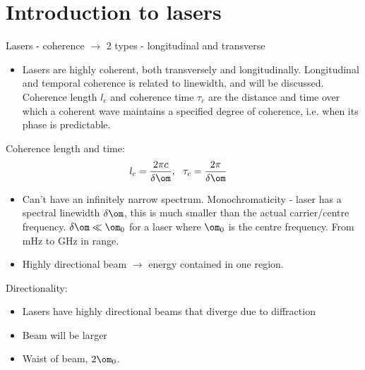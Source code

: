 \documentclass[a4paper, 11pt, normalem]{report}
\begin{document}
\section{Introduction to lasers}
Lasers - coherence $\to$ 2 types - longitudinal and transverse
\begin{itemize}
    \item Lasers are highly coherent, both transversely and longitudinally. 
        Longitudinal and temporal coherence is related to linewidth, and will be discussed. 
        Coherence length $l_c$ and coherence time $\tau_c$ are the distance and time over which a coherent wave maintains a specified degree of coherence, i.e. when its phase is predictable. 
\end{itemize}
\begin{multicols}{2}
\begin{figure}[H]
    \centering
\end{figure}
\columnbreak
Coherence length and time:
\begin{align}
    l_c &= \frac{2\pi c}{\delta\om},~~  \tau_c = \frac{2\pi}{\delta\om}
\end{align}
\end{multicols}
\begin{itemize}
    \item Can't have an infinitely narrow spectrum. 
        Monochromaticity - laser has a spectral linewidth $\delta\om$, this is much smaller than the actual carrier/centre frequency. $\delta\om\ll\om_0$ for a laser where $\om_0$ is the centre frequency. 
        From mHz to GHz in range. 
    \item Highly directional beam $\to$ energy contained in one region. 
\end{itemize}
Directionality:
\begin{itemize}
    \item Lasers have highly directional beams that diverge due to diffraction
    \item Beam will be larger
    \item Waist of beam, $2\om_0$.
\end{itemize}
\end{document}
